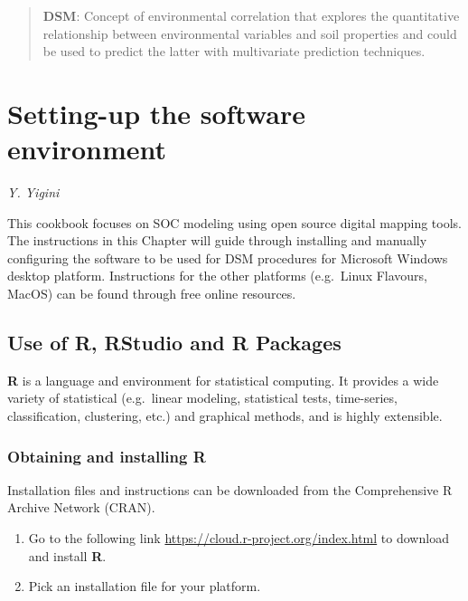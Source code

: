 \documentclass[10pt,b5paper,]{book}
\providecommand{\tightlist}{%
  \setlength{\itemsep}{0pt}\setlength{\parskip}{0pt}}
\theoremstyle{definition}
\theoremstyle{definition}
\theoremstyle{definition}
\theoremstyle{remark}
\begin{document}
\begin{quote}
\textbf{DSM}: Concept of environmental correlation that explores the
quantitative relationship between environmental variables and soil
properties and could be used to predict the latter with multivariate
prediction techniques.
\end{quote}

\hypertarget{setting-up-the-software-environment}{%
\chapter{Setting-up the software
environment}\label{setting-up-the-software-environment}}

\emph{Y. Yigini}

This cookbook focuses on SOC modeling using open source digital mapping
tools. The instructions in this Chapter will guide through installing
and manually configuring the software to be used for DSM procedures for
Microsoft Windows desktop platform. Instructions for the other platforms
(e.g.~Linux Flavours, MacOS) can be found through free online resources.

\hypertarget{use-of-r-rstudio-and-r-packages}{%
\section{Use of R, RStudio and R
Packages}\label{use-of-r-rstudio-and-r-packages}}

\textbf{R} is a language and environment for statistical computing. It
provides a wide variety of statistical (e.g.~linear modeling,
statistical tests, time-series, classification, clustering, etc.) and
graphical methods, and is highly extensible.

\hypertarget{obtaining-and-installing-r}{%
\subsection{Obtaining and installing
R}\label{obtaining-and-installing-r}}

Installation files and instructions can be downloaded from the
Comprehensive R Archive Network (CRAN).

\begin{enumerate}
\def\labelenumi{\arabic{enumi}.}
\tightlist
\item
  Go to the following link \url{https://cloud.r-project.org/index.html}
  to download and install \textbf{R}.
\item
  Pick an installation file for your platform.
\end{enumerate}
\end{document}
